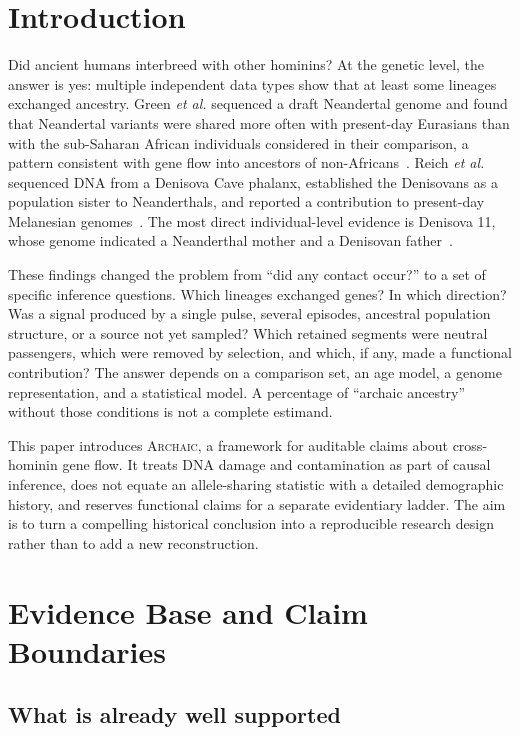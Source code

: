 \documentclass[conference]{IEEEtran}
\newcommand{\archaic}{\textsc{Archaic}}
\begin{document}
\section{Introduction}

Did ancient humans interbreed with other hominins? At the genetic level, the answer is yes: multiple independent data types show that at least some lineages exchanged ancestry. Green \emph{et al.} sequenced a draft Neandertal genome and found that Neandertal variants were shared more often with present-day Eurasians than with the sub-Saharan African individuals considered in their comparison, a pattern consistent with gene flow into ancestors of non-Africans~\cite{green2010}. Reich \emph{et al.} sequenced DNA from a Denisova Cave phalanx, established the Denisovans as a population sister to Neanderthals, and reported a contribution to present-day Melanesian genomes~\cite{reich2010}. The most direct individual-level evidence is Denisova 11, whose genome indicated a Neanderthal mother and a Denisovan father~\cite{slon2018}.

These findings changed the problem from ``did any contact occur?'' to a set of specific inference questions. Which lineages exchanged genes? In which direction? Was a signal produced by a single pulse, several episodes, ancestral population structure, or a source not yet sampled? Which retained segments were neutral passengers, which were removed by selection, and which, if any, made a functional contribution? The answer depends on a comparison set, an age model, a genome representation, and a statistical model. A percentage of ``archaic ancestry'' without those conditions is not a complete estimand.

This paper introduces \archaic{}, a framework for auditable claims about cross-hominin gene flow. It treats DNA damage and contamination as part of causal inference, does not equate an allele-sharing statistic with a detailed demographic history, and reserves functional claims for a separate evidentiary ladder. The aim is to turn a compelling historical conclusion into a reproducible research design rather than to add a new reconstruction.

\section{Evidence Base and Claim Boundaries}

\subsection{What is already well supported}
\end{document}
